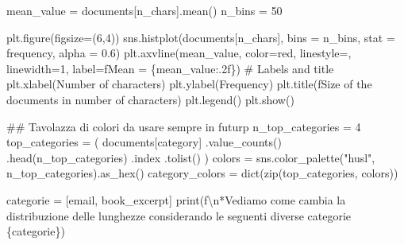 \documentclass[
  italian,
  a4paper,
]{article}
\newenvironment{Shaded}{\begin{snugshade}}{\end{snugshade}}
\newcommand{\BuiltInTok}[1]{\textcolor[rgb]{0.00,0.23,0.31}{#1}}
\newcommand{\CharTok}[1]{\textcolor[rgb]{0.13,0.47,0.30}{#1}}
\newcommand{\CommentTok}[1]{\textcolor[rgb]{0.37,0.37,0.37}{#1}}
\newcommand{\DecValTok}[1]{\textcolor[rgb]{0.68,0.00,0.00}{#1}}
\newcommand{\FloatTok}[1]{\textcolor[rgb]{0.68,0.00,0.00}{#1}}
\newcommand{\NormalTok}[1]{\textcolor[rgb]{0.00,0.23,0.31}{#1}}
\newcommand{\OperatorTok}[1]{\textcolor[rgb]{0.37,0.37,0.37}{#1}}
\newcommand{\SpecialCharTok}[1]{\textcolor[rgb]{0.37,0.37,0.37}{#1}}
\newcommand{\SpecialStringTok}[1]{\textcolor[rgb]{0.13,0.47,0.30}{#1}}
\newcommand{\StringTok}[1]{\textcolor[rgb]{0.13,0.47,0.30}{#1}}
\begin{document}
\begin{Shaded}
\begin{Highlighting}[]
\NormalTok{mean\_value }\OperatorTok{=}\NormalTok{ documents[}\StringTok{\textquotesingle{}n\_chars\textquotesingle{}}\NormalTok{].mean()}
\NormalTok{n\_bins }\OperatorTok{=} \DecValTok{50}

\NormalTok{plt.figure(figsize}\OperatorTok{=}\NormalTok{(}\DecValTok{6}\NormalTok{,}\DecValTok{4}\NormalTok{))}
\NormalTok{sns.histplot(documents[}\StringTok{\textquotesingle{}n\_chars\textquotesingle{}}\NormalTok{], bins }\OperatorTok{=}\NormalTok{ n\_bins, stat }\OperatorTok{=} \StringTok{\textquotesingle{}frequency\textquotesingle{}}\NormalTok{, alpha }\OperatorTok{=} \FloatTok{0.6}\NormalTok{)}
\NormalTok{plt.axvline(mean\_value, color}\OperatorTok{=}\StringTok{\textquotesingle{}red\textquotesingle{}}\NormalTok{, linestyle}\OperatorTok{=}\StringTok{\textquotesingle{}{-}{-}\textquotesingle{}}\NormalTok{, linewidth}\OperatorTok{=}\DecValTok{1}\NormalTok{, label}\OperatorTok{=}\SpecialStringTok{f\textquotesingle{}Mean = }\SpecialCharTok{\{}\NormalTok{mean\_value}\SpecialCharTok{:.2f\}}\SpecialStringTok{\textquotesingle{}}\NormalTok{)}
\CommentTok{\# Labels and title}
\NormalTok{plt.xlabel(}\StringTok{\textquotesingle{}Number of characters\textquotesingle{}}\NormalTok{)}
\NormalTok{plt.ylabel(}\StringTok{\textquotesingle{}Frequency\textquotesingle{}}\NormalTok{)}
\NormalTok{plt.title(}\SpecialStringTok{f\textquotesingle{}Size of the documents in number of characters\textquotesingle{}}\NormalTok{)}
\NormalTok{plt.legend()}
\NormalTok{plt.show()}

\CommentTok{\#\# Tavolazza di colori da usare sempre in  futurp}
\NormalTok{n\_top\_categories }\OperatorTok{=} \DecValTok{4}
\NormalTok{top\_categories }\OperatorTok{=}\NormalTok{ (}
\NormalTok{    documents[}\StringTok{\textquotesingle{}category\textquotesingle{}}\NormalTok{]}
\NormalTok{      .value\_counts()}
\NormalTok{      .head(n\_top\_categories)}
\NormalTok{      .index}
\NormalTok{      .tolist()}
\NormalTok{) }
\NormalTok{colors }\OperatorTok{=}\NormalTok{ sns.color\_palette(}\StringTok{"husl"}\NormalTok{, n\_top\_categories).as\_hex()}
\NormalTok{category\_colors }\OperatorTok{=} \BuiltInTok{dict}\NormalTok{(}\BuiltInTok{zip}\NormalTok{(top\_categories, colors))}

\NormalTok{categorie }\OperatorTok{=}\NormalTok{ [}\StringTok{\textquotesingle{}email\textquotesingle{}}\NormalTok{, }\StringTok{\textquotesingle{}book\_excerpt\textquotesingle{}}\NormalTok{]}
\BuiltInTok{print}\NormalTok{(}\SpecialStringTok{f\textquotesingle{}}\CharTok{\textbackslash{}n}\SpecialStringTok{*Vediamo come cambia la distribuzione delle lunghezze considerando le seguenti diverse categorie }\SpecialCharTok{\{}\NormalTok{categorie}\SpecialCharTok{\}}\SpecialStringTok{\textquotesingle{}}\NormalTok{)}


\end{Highlighting}
\end{Shaded}
\end{document}
